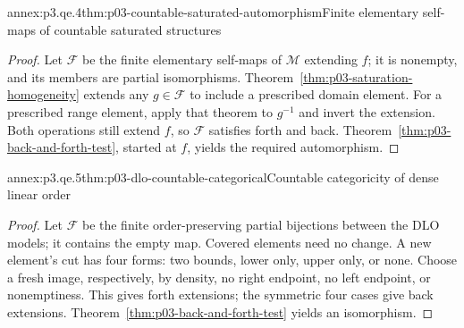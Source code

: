 \begin{annexitem}{annex:p3.qe.4}{thm:p03-countable-saturated-automorphism}{Finite elementary self-maps of countable saturated structures}
\begin{proof}
Let \(\mathcal F\) be the finite elementary self-maps of \(\mathcal M\) extending \(f\); it is nonempty, and its members are partial isomorphisms.
Theorem~\ref{thm:p03-saturation-homogeneity} extends any \(g\in\mathcal F\) to include a prescribed domain element.
For a prescribed range element, apply that theorem to \(g^{-1}\) and invert the extension.
Both operations still extend \(f\), so \(\mathcal F\) satisfies forth and back.
Theorem~\ref{thm:p03-back-and-forth-test}, started at \(f\), yields the required automorphism.
\end{proof}
\end{annexitem}

\begin{annexitem}{annex:p3.qe.5}{thm:p03-dlo-countable-categorical}{Countable categoricity of dense linear order}
\begin{proof}
Let \(\mathcal F\) be the finite order-preserving partial bijections between the DLO models; it contains the empty map.
Covered elements need no change.  A new element's cut has four forms: two bounds, lower only, upper only, or none.
Choose a fresh image, respectively, by density, no right endpoint, no left endpoint, or nonemptiness.
This gives forth extensions; the symmetric four cases give back extensions.
Theorem~\ref{thm:p03-back-and-forth-test} yields an isomorphism.
\end{proof}
\end{annexitem}
